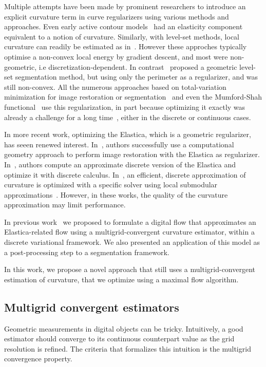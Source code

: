 \documentclass[runningheads]{llncs}
\begin{document}
Multiple attempts have been made by prominent researchers to introduce an explicit curvature term in curve regularizers
using various methods and approaches. Even early active contour models~\cite{kass88} had an elasticity component
equivalent to a notion of curvature. Similarly, with level-set methods, local curvature can readily be estimated as
in~\cite{malladi1995shape}. However these approches typically optimise a non-convex local energy by gradient descent,
and most were non-geometric, i.e discretization-dependent. In contrast~\cite{caselles97} proposed a geometric level-set
segmentation method, but using only the perimeter as a regularizer, and was still non-convex. All the numerous
approaches based on total-variation minimization for image restoration or segmentation~\cite{rudin1992nonlinear} and
even the Mumford-Shah functional~\cite{mumford89} use this regularization, in part because optimizing it exactly was
already a challenge for a long time~\cite{boykov01fast,chambolle04,appleton2005globally}, either in the discrete or
continuous cases.

In more recent work, optimizing the Elastica, which is a geometric regularizer, has seeen renewed
interest. In~\cite{masnou98inpainting}, authors successfully use a computational geometry approach to perform image
restoration with the Elastica as regularizer. In~\cite{zehiry10fast}, authors compute an approximate discrete version of
the Elastica and optimize it with discrete calculus. In~\cite{nieuwenhuis14efficient}, an efficient, discrete
approximation of curvature is optimized with a specific solver using local submodular
approximations~\cite{gorelick14local}. However, in these works, the quality of the curvature approximation may limit
performance.

In previous work~\cite{antunes2020elastica} we proposed to formulate a digital flow that approximates an
Elastica-related flow using a multigrid-convergent curvature estimator, within a discrete variational
framework. We also presented an application of this model as a post-processing step to a segmentation framework.

In this work, we propose a novel approach that still uses a multigrid-convergent estimation of curvature, that we
optimize using a maximal flow algorithm.

\subsection{Multigrid convergent estimators}
Geometric measurements in digital objects can be tricky.  Intuitively, a good estimator should converge to its
continuous counterpart value as the grid resolution is refined. The criteria that formalizes this intuition is the
multigrid convergence property.
\end{document}
